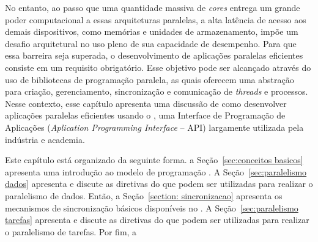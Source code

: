 \documentclass{SBCbookchapter}
\begin{document}
	No entanto, ao passo que uma quantidade massiva de \textit{cores}
	entrega um grande poder computacional a essas arquiteturas
	paralelas, a alta latência de acesso aos demais dispositivos, como
	memórias e unidades de armazenamento, impõe um desafio arquitetural
	no uso pleno de sua capacidade de desempenho. Para que essa barreira
	seja superada, o desenvolvimento de aplicações paralelas eficientes
	consiste em um requisito obrigatório. Esse objetivo pode ser
	alcançado através do uso de bibliotecas de programação paralela, as
	quais oferecem uma abstração para criação, gerenciamento,
	sincronização e comunicação de \textit{threads} e processos. Nesse
	contexto, esse capítulo apresenta uma discussão de como desenvolver
	aplicações paralelas eficientes usando o \openmp, uma Interface de
	Programação de Aplicações (\textit{Aplication Programming Interface}
	-- API) largamente utilizada pela indústria e academia. 
	
	Este capítulo está organizado da seguinte forma. a
	Seção~\ref{sec:conceitos basicos} apresenta uma introdução ao modelo
	de programação \openmp.  A Seção~\ref{sec:paralelismo dados}
	apresenta e discute as diretivas do \openmp que podem ser utilizadas
	para realizar o paralelismo de dados.  Então, a Seção~\ref{section:
	sincronizacao} apresenta os mecanismos de sincronização básicos
	disponíveis no \openmp. A Seção~\ref{sec:paralelismo tarefas}
	apresenta e discute as diretivas do \openmp que podem ser utilizadas
	para realizar o paralelismo de tarefas. Por fim, a
\end{document}
